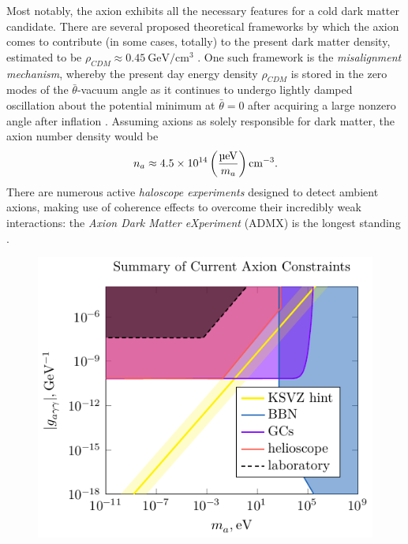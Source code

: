 
Most notably, the axion exhibits all the necessary features for a cold dark matter candidate.
There are several proposed theoretical frameworks by which the axion comes to contribute (in some cases, totally) to the present dark matter density, estimated to be $ρ_{CDM} \approx \SI{0.45}{\giga\eV\per\cubic\cm}$ \cite[§\,5.3]{landscape_2020}.
One such framework is the \emph{misalignment mechanism}, whereby the present day energy density $ρ_{CDM}$ is stored in the zero modes of the $\bar θ$-vacuum angle as it continues to undergo lightly damped oscillation about the potential minimum at $\bar θ = 0$ after acquiring a large nonzero angle after inflation \cite[§\,5.3]{landscape_2020}.
Assuming axions as solely responsible for dark matter, the axion number density would be
\begin{align}
	n_a \approx \num{4.5e14}\,\qty(\frac{\si{\micro\eV}}{m_a})\,\si{\per\cubic\cm}
.\end{align}
There are numerous active \emph{haloscope experiments} designed to detect ambient axions, making use of coherence effects to overcome their incredibly weak interactions: the \emph{Axion Dark Matter eXperiment} (ADMX) \cite{AMDX-2020} is the longest standing \cite[§\,7]{Irastorza_2018}.

\begin{figure}
	\centering
	\includegraphics{diagrams/final-bounds.pdf}
	\caption{}
	\label{fig:finish-already}
\end{figure}


